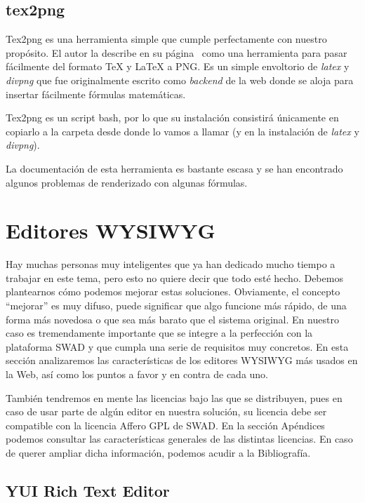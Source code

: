 \subsection{tex2png}

Tex2png es una herramienta simple que cumple perfectamente con nuestro propósito. El autor la describe en su página~\cite{xyne:tex2png} como una herramienta para pasar fácilmente del formato {\TeX} y {\LaTeX} a PNG. Es un simple envoltorio  de \emph{latex} y \emph{divpng} que fue originalmente escrito como \emph{backend} de la web donde se aloja para insertar fácilmente fórmulas matemáticas. 

Tex2png es un script bash, por lo que su instalación consistirá únicamente en copiarlo a la carpeta desde donde lo vamos a llamar (y en la instalación de \emph{latex} y \emph{divpng}).

La documentación de esta herramienta es bastante escasa y se han encontrado algunos problemas de renderizado con algunas fórmulas. 

\section{Editores WYSIWYG}

Hay muchas personas muy inteligentes que ya han dedicado mucho tiempo a trabajar en este tema, pero esto no quiere decir que todo esté hecho. Debemos plantearnos cómo podemos mejorar estas soluciones. Obviamente, el concepto ``mejorar'' es muy difuso, puede significar que algo funcione más rápido, de una forma más novedosa o que sea más barato que el sistema original. En nuestro caso es tremendamente importante que se integre a la perfección con la plataforma SWAD y que cumpla una serie de requisitos muy concretos. En esta sección analizaremos las características de los editores WYSIWYG más usados en la Web, así como los puntos a favor y en contra de cada uno. 

También tendremos en mente las licencias bajo las que se distribuyen, pues en caso de usar parte de algún editor en nuestra solución, su licencia debe ser compatible con la licencia Affero GPL de SWAD. En la sección Apéndices podemos consultar las características generales de las distintas licencias. En caso de querer ampliar dicha información, podemos acudir a la Bibliografía.

\subsection{YUI Rich Text Editor}


